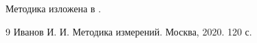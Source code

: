 Методика изложена в \cite{ivanov}.

\begin{thebibliography}{9}
   Иванов И. И. Методика измерений. Москва, 2020. 120 с.
\end{thebibliography}
